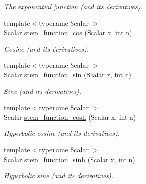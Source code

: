 \begin{DoxyCompactItemize}
\begin{DoxyCompactList}\small\item\em The exponential function (and its derivatives). \end{DoxyCompactList}\item 
\mbox{\label{namespace_eigen_1_1internal_a9727c15ffb97a40df226fce93e2628b3}} 
{\footnotesize template$<$typename Scalar $>$ }\\Scalar \hyperlink{namespace_eigen_1_1internal_a9727c15ffb97a40df226fce93e2628b3}{stem\+\_\+function\+\_\+cos} (Scalar x, int n)
\begin{DoxyCompactList}\small\item\em Cosine (and its derivatives). \end{DoxyCompactList}\item 
\mbox{\label{namespace_eigen_1_1internal_a297dc38f5c9b80e2a1da7dcf2a453c90}} 
{\footnotesize template$<$typename Scalar $>$ }\\Scalar \hyperlink{namespace_eigen_1_1internal_a297dc38f5c9b80e2a1da7dcf2a453c90}{stem\+\_\+function\+\_\+sin} (Scalar x, int n)
\begin{DoxyCompactList}\small\item\em Sine (and its derivatives). \end{DoxyCompactList}\item 
\mbox{\label{namespace_eigen_1_1internal_aab7949e5c95ec574eff5c4229da36846}} 
{\footnotesize template$<$typename Scalar $>$ }\\Scalar \hyperlink{namespace_eigen_1_1internal_aab7949e5c95ec574eff5c4229da36846}{stem\+\_\+function\+\_\+cosh} (Scalar x, int n)
\begin{DoxyCompactList}\small\item\em Hyperbolic cosine (and its derivatives). \end{DoxyCompactList}\item 
\mbox{\label{namespace_eigen_1_1internal_ab2855d150c9eebb8ed6cb63a292dda0d}} 
{\footnotesize template$<$typename Scalar $>$ }\\Scalar \hyperlink{namespace_eigen_1_1internal_ab2855d150c9eebb8ed6cb63a292dda0d}{stem\+\_\+function\+\_\+sinh} (Scalar x, int n)
\begin{DoxyCompactList}\small\item\em Hyperbolic sine (and its derivatives). \end{DoxyCompactList}\item 

\end{DoxyCompactItemize}
